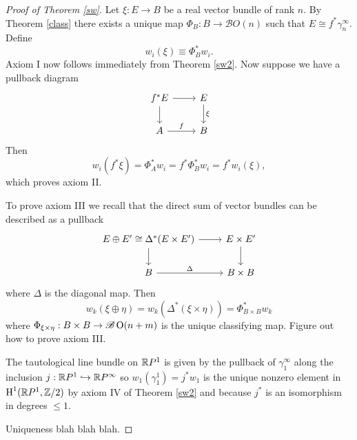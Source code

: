 \documentclass{amsart}
\begin{document}
\begin{proof}[Proof of Theorem \ref{sw}]
    Let $\xi:E\to B$ be a real vector bundle of rank $n$. By Theorem \ref{class} there exists a
    unique map $\Phi_B:B\to\mathscr{B}O(n)$ such that $E\cong f^*\gamma_n^\infty$.
    Define
    \begin{equation*}
        w_i(\xi) \equiv \Phi_B^*w_i.
    \end{equation*}
    Axiom I now follows immediately from Theorem \ref{sw2}. Now suppose we have a pullback
    diagram
    \begin{equation*}
        \begin{tikzcd}
            f^*E\ar{r}\ar{d} & E\ar{d}{\xi}\\
            A\ar{r}{f} & B
        \end{tikzcd}
    \end{equation*}
    Then
    \begin{equation*}
        w_i(f^*\xi) = \Phi_A^*w_i = f^*\Phi_B^*w_i = f^*w_i(\xi),
    \end{equation*}
    which proves axiom II.

    To prove axiom III we recall that the direct sum of vector bundles can be described as a pullback
    \begin{equation*}
        \begin{tikzcd}
            E\oplus E' \cong \Delta^*(E\times E') \ar{r}\ar{d} & E\times E'\ar{d}\\
            B\ar{r}{\Delta}& B\times B
        \end{tikzcd}
    \end{equation*}
    where $\Delta$ is the diagonal map. Then
    \begin{equation*}
        w_k(\xi\oplus\eta) = w_k(\Delta^*(\xi\times\eta)) = \Phi_{B\times B}^*w_k
    \end{equation*}
    where $\Phi_{\xi\times\eta}:B\times B\to\mathscr{B}\operatorname{O}(n+m)$ is the unique classifying
    map. {\color{magenta} Figure out how to prove axiom III.}

    The tautological line bundle on $\mathbb{R} P^1$ is given by the pullback of $\gamma_1^\infty$
    along the inclusion $j:\mathbb{R} P^1\hookrightarrow\mathbb{R} P^\infty$ so $w_1(\gamma_1^1)=j^*w_1$
    is the unique nonzero element in $\operatorname{H}^1(\mathbb{R} P^1,\mathbb{Z}/2)$ by axiom IV of Theorem \ref{sw2}
    and because $j^*$ is an isomorphism in degrees $\leqslant 1$.

    {\color{magenta} Uniqueness blah blah blah.}
\end{proof}
\end{document}
